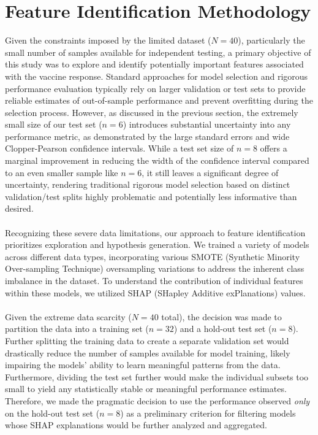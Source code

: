 \documentclass[12pt,a4paper]{report}
\begin{document}
\section{Feature Identification Methodology}
\noindent
Given the constraints imposed by the limited dataset ($N=40$), particularly the small number of samples available for independent testing, a primary objective of this study was to explore and identify potentially important features associated with the vaccine response. Standard approaches for model selection and rigorous performance evaluation typically rely on larger validation or test sets to provide reliable estimates of out-of-sample performance and prevent overfitting during the selection process. However, as discussed in the previous section, the extremely small size of our test set ($n=6$) introduces substantial uncertainty into any performance metric, as demonstrated by the large standard errors and wide Clopper-Pearson confidence intervals. While a test set size of $n=8$ offers a marginal improvement in reducing the width of the confidence interval compared to an even smaller sample like $n=6$, it still leaves a significant degree of uncertainty, rendering traditional rigorous model selection based on distinct validation/test splits highly problematic and potentially less informative than desired.\\
\\
Recognizing these severe data limitations, our approach to feature identification prioritizes exploration and hypothesis generation. We trained a variety of models across different data types, incorporating various SMOTE (Synthetic Minority Over-sampling Technique) oversampling variations to address the inherent class imbalance in the dataset. To understand the contribution of individual features within these models, we utilized SHAP (SHapley Additive exPlanations) values.\\
\\
Given the extreme data scarcity ($N=40$ total), the decision was made to partition the data into a training set ($n=32$) and a hold-out test set ($n=8$). Further splitting the training data to create a separate validation set would drastically reduce the number of samples available for model training, likely impairing the models' ability to learn meaningful patterns from the data. Furthermore, dividing the test set further would make the individual subsets too small to yield any statistically stable or meaningful performance estimates. Therefore, we made the pragmatic decision to use the performance observed \textit{only} on the hold-out test set ($n=8$) as a preliminary criterion for filtering models whose SHAP explanations would be further analyzed and aggregated.\\
\end{document}
